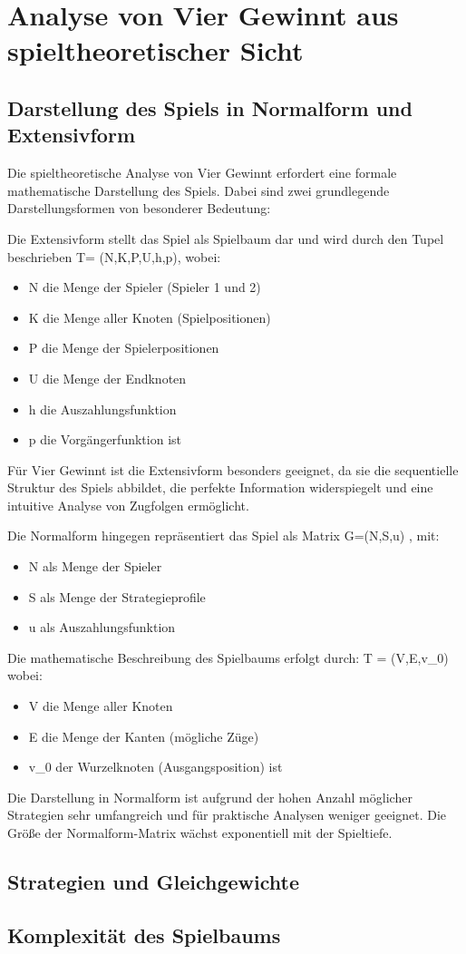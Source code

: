 \chapter{Analyse von Vier Gewinnt aus spieltheoretischer Sicht}

\section{Darstellung des Spiels in Normalform und Extensivform}
Die spieltheoretische Analyse von Vier Gewinnt erfordert eine formale mathematische Darstellung des Spiels. Dabei sind zwei grundlegende Darstellungsformen von besonderer Bedeutung:

Die Extensivform stellt das Spiel als Spielbaum dar und wird durch den Tupel  beschrieben T= (N,K,P,U,h,p), wobei:
\begin{itemize}
	\item N die Menge der Spieler (Spieler 1 und 2)
	\item K die Menge aller Knoten (Spielpositionen)
	\item P die Menge der Spielerpositionen
	\item U die Menge der Endknoten
	\item h die Auszahlungsfunktion
	\item p die Vorgängerfunktion ist
\end{itemize}
Für Vier Gewinnt ist die Extensivform besonders geeignet, da sie die sequentielle Struktur des Spiels abbildet, die perfekte Information widerspiegelt und eine intuitive Analyse von Zugfolgen ermöglicht.

Die Normalform hingegen repräsentiert das Spiel als Matrix G=(N,S,u) , mit:
\begin{itemize}
	\item N als Menge der Spieler
	\item S als Menge der Strategieprofile
	\item u als Auszahlungsfunktion
\end{itemize}

Die mathematische Beschreibung des Spielbaums erfolgt durch:
T = (V,E,v_0) 
wobei:
\begin{itemize}
	\item V die Menge aller Knoten
	\item E die Menge der Kanten (mögliche Züge)
	\item v_0 der Wurzelknoten (Ausgangsposition) ist
\end{itemize}

Die Darstellung in Normalform ist aufgrund der hohen Anzahl möglicher Strategien sehr umfangreich und für praktische Analysen weniger geeignet. Die Größe der Normalform-Matrix wächst exponentiell mit der Spieltiefe.

\section{Strategien und Gleichgewichte}
\section{Komplexität des Spielbaums}
	